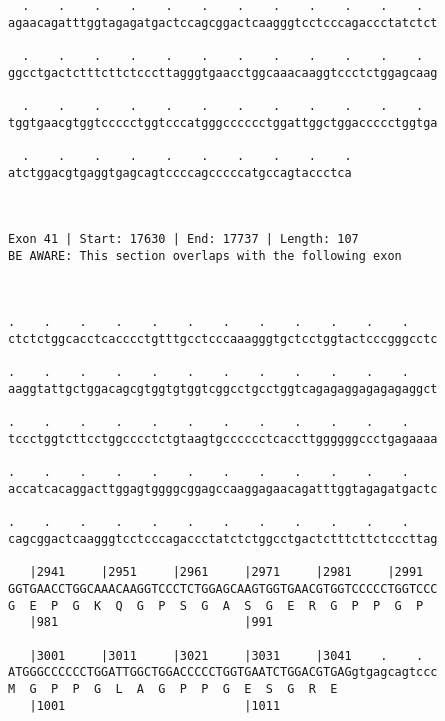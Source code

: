 \documentclass{article}
\begin{document}
\begin{Verbatim}
  .    .    .    .    .    .    .    .    .    .    .    .  
agaacagatttggtagagatgactccagcggactcaagggtcctcccagaccctatctct
                                                            
  .    .    .    .    .    .    .    .    .    .    .    .  
ggcctgactctttcttctcccttagggtgaacctggcaaacaaggtccctctggagcaag
                                                            
  .    .    .    .    .    .    .    .    .    .    .    .  
tggtgaacgtggtccccctggtcccatgggcccccctggattggctggaccccctggtga
                                                            
  .    .    .    .    .    .    .    .    .    .
atctggacgtgaggtgagcagtccccagcccccatgccagtaccctca
                                                
                                                
 
Exon 41 | Start: 17630 | End: 17737 | Length: 107
BE AWARE: This section overlaps with the following exon



.    .    .    .    .    .    .    .    .    .    .    .    
ctctctggcacctcacccctgtttgcctcccaaagggtgctcctggtactcccgggcctc
                                                            
.    .    .    .    .    .    .    .    .    .    .    .    
aaggtattgctggacagcgtggtgtggtcggcctgcctggtcagagaggagagagaggct
                                                            
.    .    .    .    .    .    .    .    .    .    .    .    
tccctggtcttcctggcccctctgtaagtgcccccctcaccttggggggccctgagaaaa
                                                            
.    .    .    .    .    .    .    .    .    .    .    .    
accatcacaggacttggagtggggcggagccaaggagaacagatttggtagagatgactc
                                                            
.    .    .    .    .    .    .    .    .    .    .    .    
cagcggactcaagggtcctcccagaccctatctctggcctgactctttcttctcccttag
                                                            
   |2941     |2951     |2961     |2971     |2981     |2991  
GGTGAACCTGGCAAACAAGGTCCCTCTGGAGCAAGTGGTGAACGTGGTCCCCCTGGTCCC
G  E  P  G  K  Q  G  P  S  G  A  S  G  E  R  G  P  P  G  P  
   |981                          |991                       
  
   |3001     |3011     |3021     |3031     |3041    .    .  
ATGGGCCCCCCTGGATTGGCTGGACCCCCTGGTGAATCTGGACGTGAGgtgagcagtccc
M  G  P  P  G  L  A  G  P  P  G  E  S  G  R  E              
   |1001                         |1011                      
  

\end{Verbatim}
\end{document}
